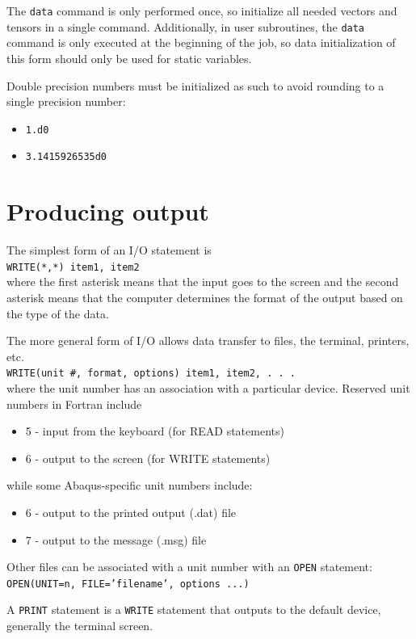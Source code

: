 \documentclass[10pt,letterpaper,oneside]{report}
\begin{document}
The \texttt{data} command is only performed once, so initialize all needed vectors and tensors in a single command.  Additionally, in user subroutines, the \texttt{data} command is only executed at the beginning of the job, so data initialization of this form should only be used for static variables.

Double precision numbers must be initialized as such to avoid rounding to a single precision number: 
\begin{itemize}
\item \texttt{1.d0}
\item \texttt{3.1415926535d0}
\end{itemize}

\section{Producing output}

The simplest form of an I/O statement is \\
\texttt{WRITE(*,*)  item1, item2} \\
where the first asterisk means that the input goes to the screen and the second asterisk means that the computer determines the format of the output based on the type of the data.

The more general form of I/O allows data transfer to files, the terminal, printers, etc.\\
\texttt{WRITE(unit \#, format, options) item1, item2, . . . } \\
where the unit number has an association with a particular device.  Reserved unit numbers in Fortran include
\begin{itemize}
\item 5 - input from the keyboard (for READ statements)
\item 6 - output to the screen (for WRITE statements)
\end{itemize}
while some Abaqus-specific unit numbers include:
\begin{itemize}
\item 6 - output to the printed output (.dat) file
\item 7 - output to the message (.msg) file
\end{itemize}
Other files can be associated with a unit number with an \texttt{OPEN} statement: \\
\texttt{OPEN(UNIT=n, FILE='filename', options ...)}

A \texttt{PRINT} statement is a \texttt{WRITE} statement that outputs to the default device, generally the terminal screen.  
\end{document}
